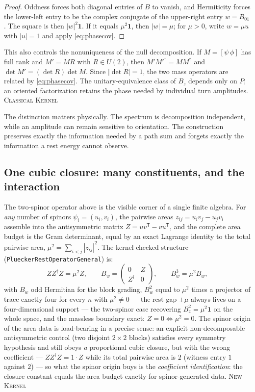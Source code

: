 \documentclass[11pt]{article}
\newcommand{\Kernel}{\textcolor{kernelcolor}{\textsc{Kernel}}}
\newcommand{\Classical}{\textcolor{classicalcolor}{\textsc{Classical}}}
\newcommand{\NewResult}{\textsc{New}}
\newcommand{\id}{\mathbf{1}}
\begin{document}
\begin{proof}
Oddness forces both diagonal entries of $B$ to vanish, and Hermiticity forces
the lower-left entry to be the complex conjugate of the upper-right entry
$w=B_{01}$.  The square is then $|w|^2\id$.  If it equals $\mu^2\id$, then
$|w|=\mu$; for $\mu>0$, write $w=\mu u$ with $|u|=1$ and apply
\eqref{eq:phasecov}.
\end{proof}

This also controls the nonuniqueness of the null decomposition.  If
$M=[\psi\ \phi]$ has full rank and $M'=MR$ with $R\in U(2)$, then
$M'M'^\dagger=MM^\dagger$ and
$\det M'=(\det R)\det M$.  Since $|\det R|=1$, the two mass operators are
related by \eqref{eq:phasecov}.  The unitary-equivalence class of $B_z$ depends
only on $P$; an oriented factorization retains the phase needed by individual
turn amplitudes.  \Classical{} \Kernel{}

The distinction matters physically.  The spectrum is decomposition
independent, while an amplitude can remain sensitive to orientation.  The
construction preserves exactly the information needed by a path sum and
forgets exactly the information a rest energy cannot observe.

\subsection{One cubic closure: many constituents, and the interaction}
\label{sec:cubiclosure}

The two-spinor operator above is the visible corner of a single finite
algebra.  For \emph{any} number of spinors $\psi_i=(u_i,v_i)$, the
pairwise areas $z_{ij}=u_iv_j-u_jv_i$ assemble into the antisymmetric
matrix $Z=uv^{\mathsf T}-vu^{\mathsf T}$, and the complete area budget
is the Gram determinant, equal by an exact Lagrange identity to the
total pairwise area, $\mu^2=\sum_{i<j}|z_{ij}|^2$.  The kernel-checked
structure (\texttt{PlueckerRestOperatorGeneral}) is:
\begin{equation}\label{eq:cubiclosure}
  ZZ^\dagger Z=\mu^2 Z,
  \qquad
  B_w=\begin{pmatrix}0&Z\\ Z^\dagger&0\end{pmatrix},
  \qquad
  B_w^3=\mu^2 B_w,
\end{equation}
with $B_w$ odd Hermitian for the block grading, $B_w^2$ equal to
$\mu^2$ times a projector of trace exactly four for every $n$ with
$\mu^2\neq0$ --- the rest gap $\pm\mu$ always lives on a four-dimensional
support --- the two-spinor case recovering $B_z^2=\mu^2\id$ on the whole
space, and the massless boundary exact: $Z=0\iff\mu^2=0$.  The spinor
origin of the area data is load-bearing in a precise sense: an explicit
non-decomposable antisymmetric control (two disjoint $2\times2$ blocks)
satisfies every symmetry hypothesis and still obeys \emph{a}
proportional cubic closure, but with the wrong coefficient --- $ZZ^\dagger
Z=1\cdot Z$ while its total pairwise area is $2$ (witness entry $1$
against $2$) --- so what the spinor origin buys is the
\emph{coefficient identification}: the closure constant equals the area
budget exactly for spinor-generated data.  \NewResult{} \Kernel{}
\end{document}
